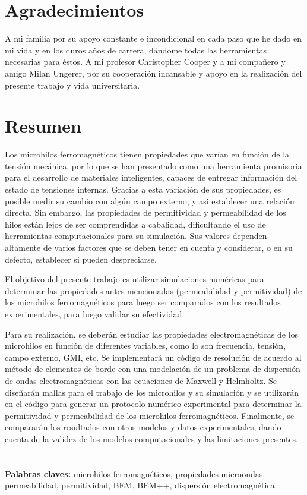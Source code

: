 \documentclass[12pt,letterpaper]{article}
\numberwithin{equation}{section}
\begin{document}
\section*{Agradecimientos}
A mi familia por su apoyo constante e incondicional en cada paso que he dado en mi vida y en los duros años de carrera, dándome todas las herramientas necesarias para éstos. A mi profesor Christopher Cooper y a mi compañero y amigo Milan Ungerer, por su cooperación incansable y apoyo en la realización del presente trabajo y vida universitaria. 

\pagebreak
\section*{Resumen}

Los microhilos ferromagnéticos tienen propiedades que varían en función de la tensión mecánica, por lo que se han presentado como una herramienta promisoria para el desarrollo de materiales inteligentes, capaces de entregar información del estado de tensiones internas. Gracias a esta variación de sus propiedades, es posible medir su cambio con algún campo externo, y asi establecer una relación directa. Sin embargo, las propiedades de permitividad y permeabilidad de los hilos están lejos de ser comprendidas a cabalidad, dificultando el uso de herramientas computacionales para su simulación. Sus valores dependen altamente de varios factores que se deben tener en cuenta y considerar, o en su defecto, establecer si pueden despreciarse. 

El objetivo del presente trabajo es utilizar 	simulaciones numéricas para determinar las propiedades antes mencionadas (permeabilidad y permitividad) de los microhilos ferromagnéticos para luego ser comparados con los resultados experimentales, para luego validar su efectividad.

Para su realización, se deberán estudiar las propiedades electromagnéticas de los microhilos en función de diferentes variables, como lo son frecuencia, tensión, campo externo, GMI, etc. Se implementará un código de resolución de acuerdo al método de elementos de borde con una modelación de un problema de dispersión de ondas electromagnéticas con las ecuaciones de Maxwell y Helmholtz. Se diseñarán mallas para el trabajo de los microhilos y su simulación y se utilizarán en el código para generar un protocolo numérico-experimental para determinar la permitividad y permeabilidad de los microhilos ferromagnéticos. Finalmente, se compararán los resultados con otros modelos y datos experimentales, dando cuenta de la validez de los modelos computacionales y las limitaciones presentes.
 \\
 \\
 \\
\noindent \textbf{Palabras claves:} microhilos ferromagnéticos, propiedades microondas, permeabilidad, permitividad, BEM, BEM++, dispersión electromagnética.
\end{document}
